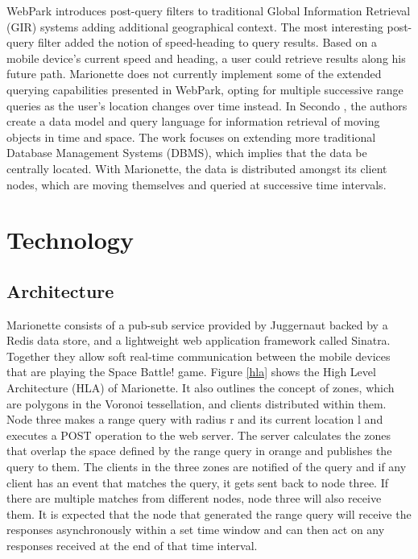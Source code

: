 \documentclass[12pt]{report}	%
\theoremstyle{definition}
\theoremstyle{remark}
\begin{document}
WebPark \cite{mountain2007geo} introduces post-query
filters to traditional Global Information Retrieval (GIR) systems adding
additional geographical context. The most interesting post-query filter
added the notion of speed-heading to query results. Based on a mobile device's
current speed and heading, a user could retrieve results along his future
path. Marionette does not currently implement some of the extended
querying capabilities presented in WebPark, opting for multiple
successive range queries as the user's location changes over time
instead. In Secondo \cite{teixeira2006querying}, the
authors create a data model and query language for information retrieval
of moving objects in time and space. The work focuses on extending more
traditional Database Management Systems (DBMS), which implies that the
data be centrally located. With Marionette, the data is distributed
amongst its client nodes, which are moving themselves and queried at
successive time intervals.

\chapter{Technology}

\section{Architecture}

Marionette consists of a pub-sub service provided by Juggernaut backed
by a Redis data store, and a lightweight web application framework
called Sinatra. Together they allow soft real-time communication between
the mobile devices that are playing the Space Battle! game. Figure
\ref{hla} shows the High Level Architecture (HLA) of
Marionette. It also outlines the concept of zones, which are polygons in
the Voronoi tessellation, and clients distributed within them. Node three
makes a range query with radius r and its current location l and
executes a POST operation to the web server. The server calculates the
zones that overlap the space defined by the range query in orange and
publishes the query to them. The clients in the three zones are notified
of the query and if any client has an event that matches the query, it
gets sent back to node three. If there are multiple matches from
different nodes, node three will also receive them. It is expected that
the node that generated the range query will receive the responses
asynchronously within a set time window and can then act on any
responses received at the end of that time interval.
\end{document}
